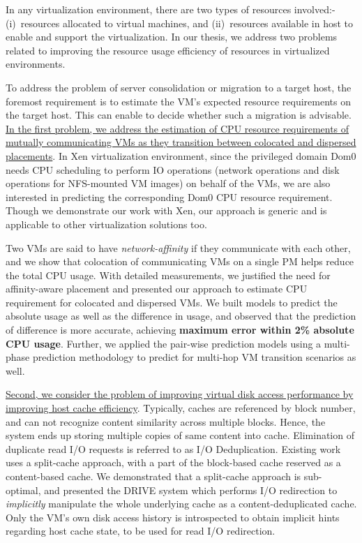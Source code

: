 
In any virtualization environment, there are two types of resources
involved:- (i)~resources allocated to virtual machines, and
(ii)~resources available in host to enable and support the virtualization.
In our thesis, we address two problems related to improving 
the resource usage efficiency of resources in virtualized environments.

To address the problem of server consolidation or migration to
a target host,
the foremost requirement is to estimate the VM's expected resource
requirements on the target host. This can enable to decide whether
such a migration is advisable.
\ul{In the first problem, 
we address the estimation of CPU resource requirements
of mutually communicating VMs as they transition between colocated
and dispersed placements}.
In Xen virtualization environment, since the privileged
domain Dom0 needs CPU scheduling to perform IO operations
(network operations and disk operations for NFS-mounted
VM images) on behalf of the VMs, we are also interested in predicting the
corresponding Dom0 CPU resource requirement.
Though we demonstrate our work with Xen, our approach is generic and
is applicable to other virtualization solutions too.

Two VMs are said to have \textit{network-affinity} if they 
communicate with each other, and we show that colocation
of communicating VMs on a single PM helps reduce the total CPU usage.
With detailed measurements, we justified the need for
affinity-aware placement and presented our approach to estimate
CPU requirement for colocated and dispersed VMs. We built models to
predict the absolute usage as well as the difference in usage, and
observed that the prediction of difference is more accurate,
achieving \textbf{maximum error within 2\% absolute CPU usage}.
Further, we applied the pair-wise prediction models using a
multi-phase prediction methodology to predict for multi-hop VM 
transition scenarios as well.

\ul{Second, we consider the problem of improving virtual 
disk access performance by improving host cache efficiency}. 
Typically, caches are referenced by block number, 
and can not recognize content similarity
across multiple blocks. Hence, the system ends up storing
multiple copies of same content into cache.
Elimination of duplicate read I/O requests is referred to as I/O Deduplication.
Existing work uses a split-cache approach, with a part of the block-based
cache reserved as a content-based cache. We demonstrated
that a split-cache approach is sub-optimal, and presented the
DRIVE system which performs I/O
redirection to \textit{implicitly} manipulate the whole underlying cache as
a content-deduplicated cache. Only the VM's own disk access history is
introspected to obtain implicit hints regarding host cache state, to be used
for read I/O redirection.

